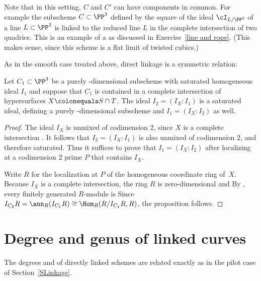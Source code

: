 Note that in this setting, $C$ and $C'$ can have components in
common. For example the subscheme $C \subset
\PP^3$ defined by the square of the ideal $\cI_{L/\PP^3}$ of a line $L
\subset \PP^3$ is linked to the reduced line $L$ in the complete
intersection of two quadrics. This is an example of a  as
%
discussed
in Exercise~\ref{line and rope}.
 (This makes sense, since this scheme is a
flat limit of twisted cubics.)

As in the smooth case treated above, direct linkage is a symmetric
relation:

\begin{proposition}\label{link unmixed}
Let $C_1\subset \PP^3$ be a purely \1-dimensional subscheme with saturated
%
homogeneous ideal $I_1$ and suppose that $C_1$ is contained in a complete
intersection of
hypersurfaces $X \colonequals  S\cap T$. The ideal $I_2 = (I_{X}:I_1)$
is a saturated ideal, defining a purely \1-dimensional subscheme and
$I_1 = (I_{X}: I_2)$ as well.
\unif
\end{proposition}

\begin{proof}
The ideal $I_{X}$ is unmixed of
%
codimension 2, since $X$ is a complete intersection
\cite[Proposition 18.13]{Eisenbud1995}. It follows
that $I_2 = (I_{X}:I_1)$
is also unmixed of codimension 2,
and therefore
saturated.
Thus it suffices to prove that $I_1 = (I_{X}: I_2)$ after localizing at
a codimension 2 prime $P$
that contains $I_{X}$.

Write $R$ for the localization at $P$ of the homogeneous coordinate ring
of~$X$.
Because $I_{X}$ is a complete intersection, the ring $R$
is zero-dimensional and
%
By \cite[Propositions 21.1 and 21.5]{Eisenbud1995}, every finitely
%
generated $R$-module is
Since
$I_{C_2}R= \ann_{R}(I_{C_1}R) \cong \Hom_R(R/I_{C_1}R, R)$,
the proposition follows.
\end{proof}

\section{Degree and genus of linked curves}
\label{duality} %

The degrees and
of directly linked schemes are related \null exactly as in the
pilot case of Section~\ref{SLinkage}.

